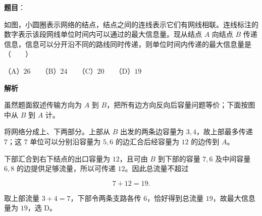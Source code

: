 \begin{answer}

\textbf{题目}：

如图，小圆圈表示网络的结点，结点之间的连线表示它们有网线相联。连线标注的数字表示该段网线单位时间内可以通过的最大信息量。现从结点 $A$ 向结点 $B$ 传递信息，信息可以分开沿不同的路线同时传递，则单位时间内传递的最大信息量是\mbox{（　　）}
\nopagebreak[4]
\begin{center}\end{center}
\nopagebreak[4]
（A）$26$　　（B）$24$　　（C）$20$　　（D）$19$

\textbf{解析}

虽然题面叙述传输方向为 $A$ 到 $B$，把所有边方向反向后容量问题等价；下面按图中从 $B$ 到 $A$ 计。

将网络分成上、下两部分。上部从 $B$ 出发的两条边容量为 $3,4$，故上部最多传递 $7$；这 $7$ 单位可以分别沿容量为 $5,6$ 的边汇合后经容量为 $12$ 的边传到 $A$。

下部汇合到右下结点的出口容量为 $12$，且可由 $B$ 到下部的容量 $7,6$ 及中间容量 $6,8$ 的边提供足够流量，所以可传递 $12$。因此总流量不超过

\nopagebreak[4]
\[
7+12=19.
\]

取上部流量 $3+4=7$，下部令两条支路各传 $6$，恰好得到总流量 $19$，故最大信息量为 $19$，选 D。


\end{answer}

